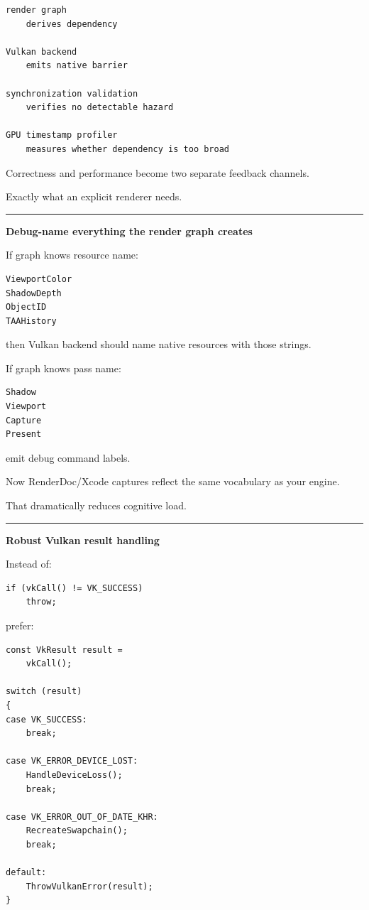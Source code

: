 \begin{verbatim}
render graph
    derives dependency

Vulkan backend
    emits native barrier

synchronization validation
    verifies no detectable hazard

GPU timestamp profiler
    measures whether dependency is too broad
\end{verbatim}

Correctness and performance become two separate feedback channels.

Exactly what an explicit renderer needs.

\begin{center}\rule{0.5\linewidth}{0.5pt}\end{center}

\textbf{Debug-name everything the render graph creates}

If graph knows resource name:

\begin{verbatim}
ViewportColor
ShadowDepth
ObjectID
TAAHistory
\end{verbatim}

then Vulkan backend should name native resources with those strings.

If graph knows pass name:

\begin{verbatim}
Shadow
Viewport
Capture
Present
\end{verbatim}

emit debug command labels.

Now RenderDoc/Xcode captures reflect the same vocabulary as your engine.

That dramatically reduces cognitive load.

\begin{center}\rule{0.5\linewidth}{0.5pt}\end{center}

\textbf{Robust Vulkan result handling}

Instead of:

\begin{verbatim}
if (vkCall() != VK_SUCCESS)
    throw;
\end{verbatim}

prefer:

\begin{verbatim}
const VkResult result =
    vkCall();

switch (result)
{
case VK_SUCCESS:
    break;

case VK_ERROR_DEVICE_LOST:
    HandleDeviceLoss();
    break;

case VK_ERROR_OUT_OF_DATE_KHR:
    RecreateSwapchain();
    break;

default:
    ThrowVulkanError(result);
}
\end{verbatim}

